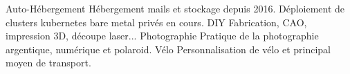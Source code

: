 \interest%
{Auto-Hébergement}%
{Hébergement mails et stockage depuis 2016. Déploiement de clusters kubernetes
bare metal privés en cours.}%
{%
}%
\interest%
{DIY}%
{Fabrication, CAO, impression 3D, découpe laser...}%
{%
}%
\interest%
{Photographie}%
{Pratique de la photographie argentique, numérique et polaroid.}%
{%
}%
\interest%
{Vélo}%
{Personnalisation de vélo et principal moyen de transport.}%
{%
}%
